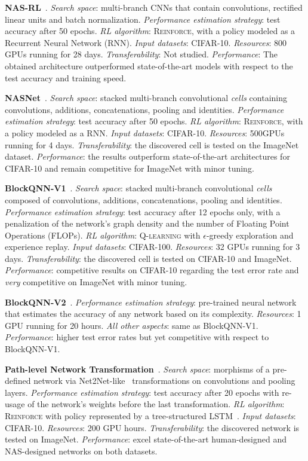 \textbf{NAS-RL}~\citep{ZophNAS1}. \emph{Search space}: multi-branch CNNs that contain convolutions, rectified linear units and batch normalization. \emph{Performance estimation strategy}: test accuracy after 50 epochs. \emph{RL algorithm}: \textsc{Reinforce}, with a policy modeled as a Recurrent Neural Network (RNN). \emph{Input datasets}: CIFAR-10. \emph{Resources}: 800 GPUs running for 28 days. \emph{Transferability}: Not studied. \emph{Performance}: The obtained architecture outperformed state-of-the-art models with respect to the test accuracy and training speed.

\textbf{NASNet}~\citep{ZophNAS2}. \emph{Search space}: stacked multi-branch convolutional \textit{cells} containing convolutions, additions, concatenations, pooling and identities. \emph{Performance estimation strategy}: test accuracy after 50 epochs. \emph{RL algorithm}: \textsc{Reinforce}, with a policy modeled as a RNN. \emph{Input datasets}: CIFAR-10. \emph{Resources}: 500GPUs running for 4 days. \emph{Transferability}: the discovered cell is tested on the ImageNet dataset. \emph{Performance}: the results outperform state-of-the-art architectures for CIFAR-10 and remain competitive for ImageNet with minor tuning.

\textbf{BlockQNN-V1}~\citep{BlockQNN}. \emph{Search space}: stacked multi-branch convolutional \textit{cells} composed of convolutions, additions, concatenations, pooling and identities. \emph{Performance estimation strategy}: test accuracy after 12 epochs only, with a penalization of the network's graph density and the number of Floating Point Operations (FLOPs). \emph{RL algorithm}: \textsc{Q-learning} with $\epsilon$-greedy exploration and experience replay. \emph{Input datasets}: CIFAR-100. \emph{Resources}: 32 GPUs running for 3 days. \emph{Transferability}: the discovered cell is tested on CIFAR-10 and ImageNet. \emph{Performance}: competitive results on CIFAR-10 regarding the test error rate and \textit{very} competitive on ImageNet with minor tuning.
 
\textbf{BlockQNN-V2}~\citep{BlockQNN}. \emph{Performance estimation strategy}: pre-trained neural network that estimates the accuracy of any network based on its complexity. \emph{Resources}: 1 GPU running for 20 hours. \emph{All other aspects}: same as BlockQNN-V1. \emph{Performance}: higher test error rates but yet competitive with respect to BlockQNN-V1.

\textbf{Path-level Network Transformation}~\citep{PathNAS}. \emph{Search space}: morphisms of a pre-defined network via Net2Net-like~\citep{Net2Net} transformations on convolutions and pooling layers. \emph{Performance estimation strategy}: test accuracy after 20 epochs with re-usage of the network's weights before the last transformation. \emph{RL algorithm}: \textsc{Reinforce} with policy represented by a tree-structured LSTM~\citep{TreeLSTM}. \emph{Input datasets}: CIFAR-10. \emph{Resources}: 200 GPU hours. \emph{Transferability}: the discovered network is tested on ImageNet. \emph{Performance}: excel state-of-the-art human-designed and NAS-designed networks on both datasets.

